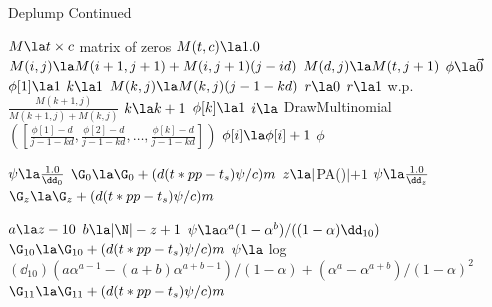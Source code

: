 \begin{algorithm}
	\begin{algorithmic}[1]
	\caption{Deplump Continued}
	
		\State $M \la  t \times c$ matrix of zeros
		\State $M(t,c) \la 1.0$
				\State $M(i,j) \la M(i +1, j+1) + M(i,j+1)(j - id)$ 
			\EndFor
			\State $M(d,j) \la M(t,j+1)$
		\EndFor
		\State $\phi \la \vec 0$ 
		\State $\phi[1] \la 1$
		\State $k \la 1$
			\State $M(k,j) \la M(k,j)(j-1 -k d)$
			\State $r \la 0$
			\State $r \la 1 $ w.p. $\frac{M(k+1,j)}{M(k+1,j) + M(k,j)}$
				\State $k \la k + 1$
				\State $\phi[k]  \la 1$
			\Else
				\State $i \la$ DrawMultinomial$([\frac{\phi[1] - d}{j-1 -kd}, \frac{\phi[2] - d}{j-1 -kd}, \ldots, \frac{\phi[k] - d}{j-1 -kd}])$
				\State $\phi[i] \la \phi[i] + 1$
			\EndIf
		\EndFor
		\State \Return $\phi$
	\EndFunction

				\State $ \psi \la \frac{1.0}{\dd_0}$
				\State $\G_0 \la \G_0 + (d(t * pp - t_s)\psi / c)  m$
			\Else
				\State $z \la |$PA(\N)$| + 1$
					\State $\psi \la \frac{1.0}{\dd_z}$
					\State $\G_z \la \G_z + (d(t * pp - t_s) \psi / c)  m$	
				\EndWhile
				
					\State $a \la z - 10$
					\State $b \la |\N| - z + 1$
					\State $\psi \la \alpha^a(1 - \alpha^b) / ((1 - \alpha)  \dd_{10})$ 
					\State $\G_{10} \la \G_{10} + (d(t * pp - t_s) \psi / c)  m$	
					\State $\psi \la$ log$(\dd_{10}) (a \alpha^{a-1} - (a + b)\alpha^{a + b-1}) / (1 - \alpha) + (\alpha^a - \alpha^{a + b}) / (1 - \alpha)^2$
					\State $\G_{11} \la \G_{11} + (d(t * pp - t_s)\psi / c)  m$	
				\EndIf
			\EndIf
		\EndIf
	\EndFunction

	\end{algorithmic}	
\end{algorithm}

